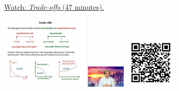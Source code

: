 
\begin{minipage}{10cm}
    \href{https://act4e-spring21.netlify.app/videos/spring2021-tradeoffs:tradeoffs.html}{Watch: \emph{Trade-offs} (47 minutes).}
        
    \href{https://act4e-spring21.netlify.app/videos/spring2021-tradeoffs:tradeoffs.html}{\includegraphics[height=3.5cm]{spring2021-tradeoffs:tradeoffs/thumbnails.jpg}}
    \href{https://act4e-spring21.netlify.app/videos/spring2021-tradeoffs:tradeoffs.html}{\includegraphics[height=2.5cm]{spring2021-tradeoffs:tradeoffs/qrcode.png}}
\end{minipage}
